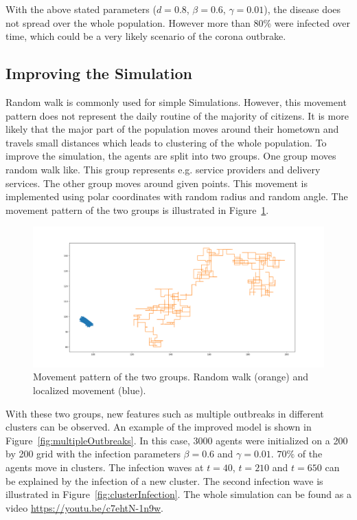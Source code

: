 With the above stated parameters ($d=0.8$, $\beta=0.6$, $\gamma=0.01$), the disease does not spread over the whole population. However more than 80\% were infected over time, which could be a very likely scenario of the corona outbrake.


\subsection{Improving the Simulation}
Random walk is commonly used for simple Simulations. However, this movement pattern does not represent the daily routine of the majority of citizens. It  is more likely that the major part of the population moves around their hometown and travels small distances which leads to clustering of the whole population. To improve the simulation, the agents are split into two groups. One group moves random walk like. This group represents e.g. service providers and delivery services. The other group moves around given points. This movement is implemented using polar coordinates with random radius and random angle. The movement pattern of the two groups is illustrated in Figure~\ref{fig:movementPattern}. 
\begin{figure}[H]
	\centering
	\includegraphics[width=0.9\linewidth]{img/movementPattern.png}
	\caption{Movement pattern of the two groups. Random walk (orange) and localized movement (blue).}%
	\label{fig:movementPattern}
\end{figure}

With these two groups, new features such as multiple outbreaks in different clusters can be observed. An example of the improved model is shown in Figure~\ref{fig:multipleOutbreaks}. In this case, 3000 agents were initialized on a 200 by 200 grid with the infection parameters $\beta=0.6$ and $\gamma = 0.01$. $70\%$ of the agents move in clusters. The infection waves at $t = 40$, $t = 210$ and $t= 650$ can be explained by the infection of a new cluster. The second infection wave is illustrated in Figure~\ref{fig:clusterInfection}. The whole simulation can be found  as a video \url{https://youtu.be/c7ehtN-1n9w}.

